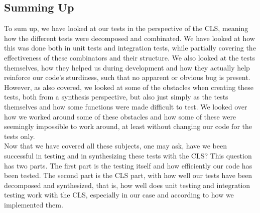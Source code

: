 \subsection{Summing Up} \label{summingUp}
To sum up, we have looked at our tests in the perspective of the CLS, meaning how the different tests were decomposed and combinated. We have looked at how this was done both in unit tests and integration tests, while partially covering the effectiveness of these combinators and their structure. We also looked at the tests themselves, how they helped us during development and how they actually help reinforce our code's sturdiness, such that no apparent or obvious bug is present. However, as also covered, we looked at some of the obstacles when creating these tests, both from a synthesis perspective, but also just simply as the tests themselves and how some functions were made difficult to test. We looked over how we worked around some of these obstacles and how some of these were seemingly impossible to work around, at least without changing our code for the tests only. \\
Now that we have covered all these subjects, one may ask, have we been successful in testing and in synthesizing these tests with the CLS? This question has two parts. The first part is the testing itself and how efficiently our code has been tested. The second part is the CLS part, with how well our tests have been decomposed and synthesized, that is, how well does unit testing and integration testing work with the CLS, especially in our case and according to how we implemented them. \\
\\
